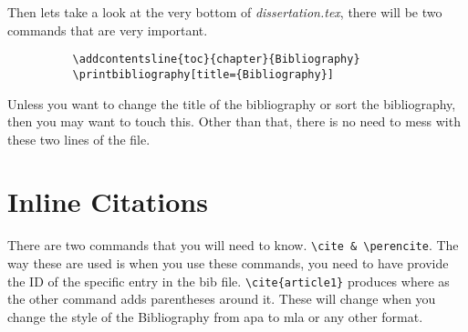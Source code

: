 \documentclass[./dissertation.tex]{subfiles}
\begin{document}
        Then lets take a look at the very bottom of \textit{dissertation.tex}, there will be two commands that are very important.
        \begin{verbatim}
          \addcontentsline{toc}{chapter}{Bibliography}
          \printbibliography[title={Bibliography}]
        \end{verbatim}
        Unless you want to change the title of the bibliography or sort the bibliography, then you may want to touch this. Other than that, there is no need to mess with these two lines of the file.

    \section{Inline Citations}
    There are two commands that you will need to know. \verb+\cite & \perencite+. The way these are used is when you use these commands, you need to have provide the ID of the specific entry in the bib file. \verb+\cite{article1}+ produces \cite{article1} where as the other command adds parentheses around it. These will change when you change the style of the Bibliography from apa to mla or any other format. 
    \parencite{article1}
    \parencite{article2}
\end{document}
